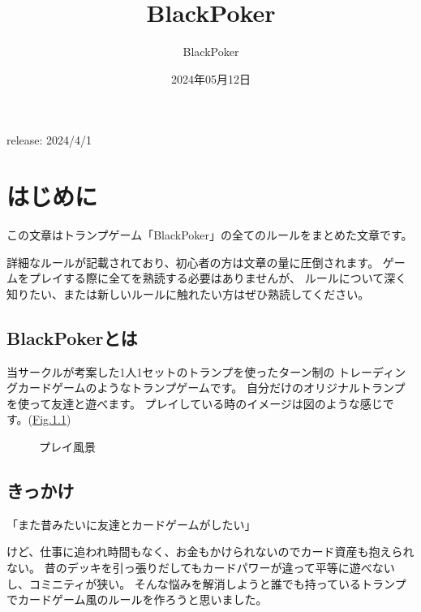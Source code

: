 \documentclass[letterpaper,10pt,dvipdfmx]{sphinxmanual}
\title{BlackPoker}
\date{2024年05月12日}
\author{BlackPoker}
\begin{document}
\pagestyle{empty}
\sphinxmaketitle
\pagestyle{plain}
\sphinxtableofcontents
\pagestyle{normal}
\label{\detokenize{index::doc}}


\sphinxAtStartPar
release: 2024/4/1

\sphinxstepscope


\chapter{はじめに}
\label{\detokenize{init/init:init-rst}}\label{\detokenize{init/init:id1}}\label{\detokenize{init/init::doc}}
\sphinxAtStartPar
この文章はトランプゲーム「BlackPoker」の全てのルールをまとめた文章です。

\sphinxAtStartPar
詳細なルールが記載されており、初心者の方は文章の量に圧倒されます。
ゲームをプレイする際に全てを熟読する必要はありませんが、
ルールについて深く知りたい、または新しいルールに触れたい方はぜひ熟読してください。


\section{BlackPokerとは}
\label{\detokenize{init/init:blackpoker}}
\sphinxAtStartPar
当サークルが考案した1人1セットのトランプを使ったターン制の
トレーディングカードゲームのようなトランプゲームです。
自分だけのオリジナルトランプを使って友達と遊べます。
プレイしている時のイメージは図のような感じです。(\hyperref[\detokenize{init/init:play-image}]{Fig.\@ \ref{\detokenize{init/init:play-image}}})

\begin{figure}[htbp]
\centering
\capstart

\noindent{}
\caption{プレイ風景}\label{\detokenize{init/init:id8}}\label{\detokenize{init/init:play-image}}\end{figure}


\section{きっかけ}
\label{\detokenize{init/init:id2}}
\begin{sphinxVerbatim}[commandchars=\\\{\}]
「また昔みたいに友達とカードゲームがしたい」
\end{sphinxVerbatim}

\sphinxAtStartPar
けど、仕事に追われ時間もなく、お金もかけられないのでカード資産も抱えられない。
昔のデッキを引っ張りだしてもカードパワーが違って平等に遊べないし、コミニティが狭い。
そんな悩みを解消しようと誰でも持っているトランプでカードゲーム風のルールを作ろうと思いました。
\end{document}
